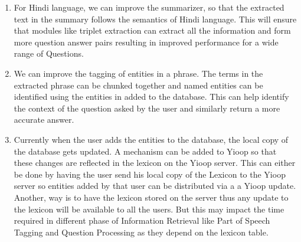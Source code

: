 \begin{enumerate}
\item
For Hindi language, we can improve the summarizer, so that the extracted text in the summary follows the semantics of Hindi language. This will ensure that modules like triplet extraction can extract all the information and form more question answer pairs resulting in improved performance for a wide range of Questions.

\item
We can improve the tagging of entities in a phrase. The terms in the extracted phrase can be chunked together and named entities can be identified using the entities in added to the database. This can help identify the context of the question asked by the user and similarly return a more accurate answer.

\item
Currently when the user adds the entities to the database, the local copy of the database gets updated. A mechanism can be added to Yioop so that these changes are reflected in the lexicon on the Yioop server. This can either be done by having the user send his local copy of the Lexicon to the Yioop server so entities added by that user can be distributed via a a Yioop update. Another, way is to have the lexicon stored on the server thus any update to the lexicon will be available to all the users. But this may impact the time required in different phase of Information Retrieval like Part of Speech Tagging and Question Processing as they depend on the lexicon table.
\end{enumerate}
